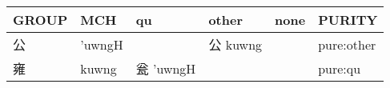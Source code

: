 \documentclass[14pt,a4paper]{scrartcl}
\begin{document}
\begin{longtable}[c]{@{}llllll@{}}
\toprule
\begin{minipage}[b]{0.14\columnwidth}\raggedright\strut
GROUP
\strut\end{minipage} &
\begin{minipage}[b]{0.14\columnwidth}\raggedright\strut
MCH
\strut\end{minipage} &
\begin{minipage}[b]{0.14\columnwidth}\raggedright\strut
qu
\strut\end{minipage} &
\begin{minipage}[b]{0.14\columnwidth}\raggedright\strut
other
\strut\end{minipage} &
\begin{minipage}[b]{0.14\columnwidth}\raggedright\strut
none
\strut\end{minipage} &
\begin{minipage}[b]{0.14\columnwidth}\raggedright\strut
PURITY
\strut\end{minipage}\tabularnewline
\midrule
\endhead
\begin{minipage}[t]{0.14\columnwidth}\raggedright\strut
公
\strut\end{minipage} &
\begin{minipage}[t]{0.14\columnwidth}\raggedright\strut
'uwngH
\strut\end{minipage} &
\begin{minipage}[t]{0.14\columnwidth}\raggedright\strut
\strut\end{minipage} &
\begin{minipage}[t]{0.14\columnwidth}\raggedright\strut
公 kuwng
\strut\end{minipage} &
\begin{minipage}[t]{0.14\columnwidth}\raggedright\strut
\strut\end{minipage} &
\begin{minipage}[t]{0.14\columnwidth}\raggedright\strut
pure:other
\strut\end{minipage}\tabularnewline
\begin{minipage}[t]{0.14\columnwidth}\raggedright\strut
雍
\strut\end{minipage} &
\begin{minipage}[t]{0.14\columnwidth}\raggedright\strut
kuwng
\strut\end{minipage} &
\begin{minipage}[t]{0.14\columnwidth}\raggedright\strut
瓮 'uwngH
\strut\end{minipage} &
\begin{minipage}[t]{0.14\columnwidth}\raggedright\strut
\strut\end{minipage} &
\begin{minipage}[t]{0.14\columnwidth}\raggedright\strut
\strut\end{minipage} &
\begin{minipage}[t]{0.14\columnwidth}\raggedright\strut
pure:qu
\strut\end{minipage}\tabularnewline
\bottomrule
\end{longtable}
\end{document}
